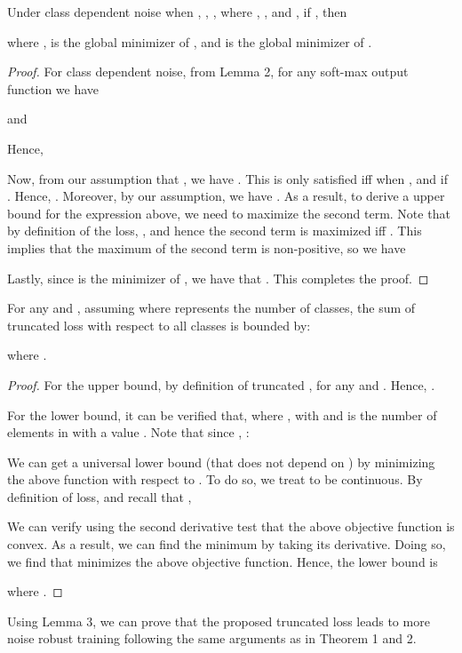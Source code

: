 \documentclass{article}
\begin{document}
\begin{theorem}
Under class dependent noise when , , , where , , and , if , then

where ,  is the global minimizer of , and  is the global minimizer of .
\end{theorem}
\begin{proof}
For class dependent noise, from Lemma 2, for any soft-max output function  we have

and 

Hence, 

Now, from our assumption that , we have . This is only satisfied iff  when , and  if . Hence,  . Moreover, by our assumption, we have . As a result, to derive a upper bound for the expression above, we need to maximize the second term. Note that by definition of the  loss,  , and hence the second term is maximized iff  . 
This implies that the maximum of the second term is non-positive, so we have 

Lastly, since  is the minimizer of , we have that . This completes the proof.
\end{proof}

\begin{lemma}
For any  and , assuming  where  represents the number of classes, the sum of truncated  loss with respect to all classes is bounded by:

where .
\end{lemma}
\begin{proof}
For the upper bound, by definition of truncated ,  for any  and . Hence, . 


For the lower bound, it can be verified that,   
where , with  and  is the number of elements in  with a value .  Note that since , : 

We can get a universal lower bound (that does not depend on ) by minimizing the above function with respect to . To do so, we treat  to be continuous. By definition of  loss, and recall that ,

We can verify using the second derivative test that the above objective function is convex. As a result, we can find the minimum by taking its derivative. Doing so, we find that  minimizes the above objective function. Hence, the lower bound is 

where .
\end{proof}
\begin{remark}
Using Lemma 3, we can prove that the proposed truncated loss leads to more noise robust training following the same arguments as in Theorem 1 and 2.  
\end{remark}
\end{document}
